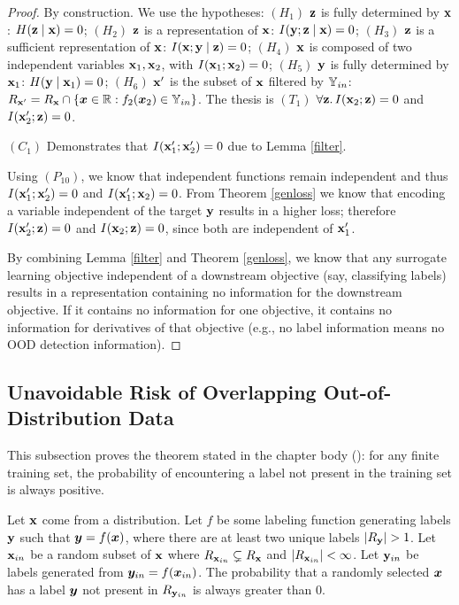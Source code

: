 \begin{proof}
By construction. We use the hypotheses: $(H_1)$ ${\mathbf{z}}$ is fully determined by ${\mathbf{x}}$: $H({\mathbf{z}} \mid {\mathbf{x}}) = 0$; $(H_2)$ ${\mathbf{z}}$ is a representation of ${\mathbf{x}}$: $I({\mathbf{y}} ; {\mathbf{z}} \mid {\mathbf{x}})=0$; $(H_3)$ ${\mathbf{z}}$ is a sufficient representation of ${\mathbf{x}}$: $I({\mathbf{x}} ; {\mathbf{y}} \mid {\mathbf{z}})=0$; $(H_4)$ ${\mathbf{x}}$ is composed of two independent variables ${\mathbf{x}}_1, {\mathbf{x}}_2$, with $I({\mathbf{x}}_1 ; {\mathbf{x}}_2) = 0$; $(H_5)$ ${\mathbf{y}}$ is fully determined by ${\mathbf{x}}_1$: $H({\mathbf{y}} \mid {\mathbf{x}}_1) = 0$; $(H_6)$ ${\mathbf{x}}'$ is the subset of ${\mathbf{x}}$ filtered by ${\mathbb{Y}}_{in}$: $R_{{\mathbf{x}}'} = R_{{\mathbf{x}}} \cap \{{\bm{x}} \in \mathbb{R}: f_2({\bm{x}}_2) \in {\mathbb{Y}}_{in} \}$. The thesis is $(T_1)$ $\forall {\mathbf{z}}.\, I({\mathbf{x}}_2 ; {\mathbf{z}}) = 0$ and $I({\mathbf{x}}_2' ; {\mathbf{z}}) = 0$.

$(C_1)$ Demonstrates that $I({\mathbf{x}}_1'; {\mathbf{x}}_2') = 0$ due to Lemma \ref{filter}.

Using $(P_{10})$, we know that independent functions remain independent and thus $I({\mathbf{x}}_1'; {\mathbf{x}}_2') = 0$ and $I({\mathbf{x}}_1'; {\mathbf{x}}_2) = 0$. From Theorem \ref{genloss} we know that encoding a variable independent of the target ${\mathbf{y}}$ results in a higher loss; therefore $I({\mathbf{x}}_2'; {\mathbf{z}}) = 0$ and $I({\mathbf{x}}_2; {\mathbf{z}}) = 0$, since both are independent of ${\mathbf{x}}_1'$.

By combining Lemma \ref{filter} and Theorem \ref{genloss}, we know that any surrogate learning objective independent of a downstream objective (say, classifying labels) results in a representation containing no information for the downstream objective. If it contains no information for one objective, it contains no information for derivatives of that objective (e.g., no label information means no OOD detection information).
\end{proof}

\subsection{Unavoidable Risk of Overlapping Out-of-Distribution Data}
\label{app:overlaprisk}

This subsection proves the theorem stated in the chapter body (): for any finite training set, the probability of encountering a label not present in the training set is always positive.

\begin{theorem}
Let ${\mathbf{x}}$ come from a distribution. Let $f$ be some labeling function generating labels ${\mathbf{y}}$ such that ${\bm{y}} = f({\bm{x}})$, where there are at least two unique labels $|R_{\mathbf{y}}| > 1$. Let ${\mathbf{x}}_{in}$ be a random subset of ${\mathbf{x}}$ where $R_{{\mathbf{x}}_{in}} \subsetneq R_{\mathbf{x}}$ and $|R_{{\mathbf{x}}_{in}}| < \infty$. Let ${\mathbf{y}}_{in}$ be labels generated from ${\bm{y}}_{in} = f({\bm{x}}_{in})$. The probability that a randomly selected ${\bm{x}}$ has a label ${\bm{y}}$ not present in $R_{{\mathbf{y}}_{in}}$ is always greater than $0$.
\label{overlaprisk}
\end{theorem}

